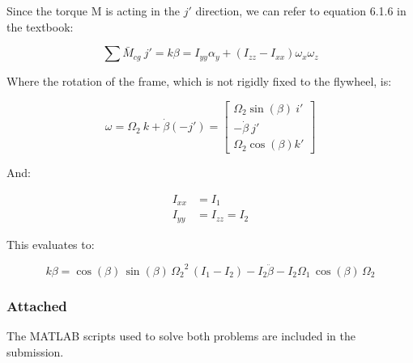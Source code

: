 \documentclass[12pt, letterpaper]{../assignment}
\begin{document}
Since the torque M is acting in the $j'$ direction,
we can refer to equation 6.1.6 in the textbook:

$$ \sum \bar{M}_{cg} \ j' = k \beta = I_{yy} \alpha_y +
    \left( I_{zz} - I_{xx} \right) \omega_x \omega_z $$


Where the rotation of the frame, which is not rigidly fixed to the flywheel, is:

$$ \omega = \Omega_2\ k + \dot{\beta}(-j') = 
\left[\begin{array}{r}
    \Omega _{2} \sin\left(\beta \right)\  i' \\
    -\dot{\beta}\  j'  \\
    \Omega _{2} \cos\left(\beta \right)  k' 
\end{array}\right] $$

And:

\begin{equation*}
    \begin{aligned}
        I_{xx} &= I_1\\
        I_{yy} &= I_{zz} = I_2
    \end{aligned}
\end{equation*}

This evaluates to:

\begin{answer}
$$  k \beta = 
\cos\left(\beta \right)\,\sin\left(\beta \right)\,{\Omega _{2}}^2\,\left(I_{1}-I_{2}\right)-I_{2}\ddot{\beta} -I_{2} \Omega _{1}\,\cos\left(\beta \right)\,\Omega _{2}$$
\end{answer}

\subsubsection*{Attached}
The MATLAB scripts used to solve both problems are included in the submission.

\end{document}
